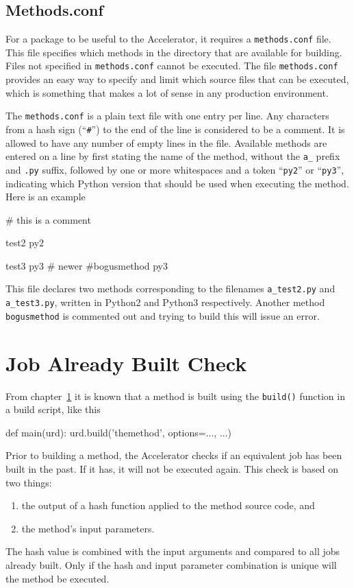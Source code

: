 \subsection{Methods.conf}
\label{sec:methods_conf}
For a package to be useful to the Accelerator, it requires
a \texttt{methods.conf} file.  This file specifies which methods in
the directory that are available for building.  Files not specified
in \texttt{methods.conf} cannot be executed.  The
file \texttt{methods.conf} provides an easy way to specify and limit
which source files that can be executed, which is something that makes
a lot of sense in any production environment.

The \texttt{methods.conf} is a plain text file with one entry per
line.  Any characters from a hash sign (``\texttt{\#}'') to the end of
the line is considered to be a comment.  It is allowed to have any
number of empty lines in the file.  Available methods are entered on a
line by first stating the name of the method, without the \texttt{a\_}
prefix and \texttt{.py} suffix, followed by one or more whitespaces
and a token ``\texttt{py2}'' or ``\texttt{py3}'', indicating which
Python version that should be used when executing the method.  Here is an example
\begin{shell}
# this is a comment

test2           py2

test3           py3  # newer
#bogusmethod    py3
\end{shell}
This file declares two methods corresponding to the
filenames \texttt{a\_test2.py} and \texttt{a\_test3.py}, written in
Python2 and Python3 respectively.  Another method \texttt{bogusmethod}
is commented out and trying to build this will issue an error.





\section{Job Already Built Check}

From chapter~\ref{} it is known that a method is built using
the \texttt{build()} function in a build script, like this
\begin{python}
def main(urd):
    urd.build('themethod', options=..., ...)
\end{python}

Prior to building a method, the Accelerator checks if an equivalent
job has been built in the past.  If it has, it will not be executed
again.  This check is based on two things:
\begin{enumerate}
\item  the output of a hash function applied to the method source code, and
\item  the method's input parameters.
\end{enumerate}
The hash value is combined with the input arguments and compared to
all jobs already built.  Only if the hash and input parameter
combination is unique will the method be executed.



